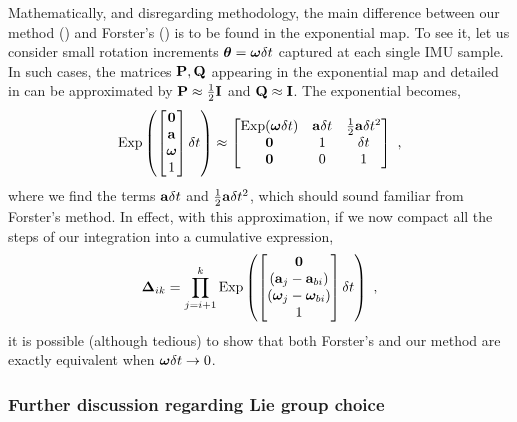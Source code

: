 Mathematically, and disregarding methodology, the main difference between our method () and Forster's \cite{forster2017-TRO} () is to be found in the exponential map. 
To see it, let us consider small rotation increments ${{\bm \theta}}={{\bm \omega}}\delta t$ captured at each single IMU sample. 
In such cases, the matrices ${\bf P},{\bf Q}$ appearing in the exponential map  and detailed in  can be approximated by ${\bf P}\approx\tfrac12{\bf I}$ and ${\bf Q}\approx{\bf I}$.
The exponential becomes,
%
\begin{align}
    \operatorname*{Exp}\left(\begin{bmatrix}
    \bf0 \\ {\bf a} \\ {{\bm \omega}} \\ 1
    \end{bmatrix}\delta t\right) \approx \begin{bmatrix}
    \operatorname*{Exp}({{\bm \omega}}\delta t) & {\bf a}\delta t & \tfrac12{\bf a}\delta t^2 \\
    \bf0 & 1 & \delta t \\
    \bf0 & 0 & 1
    \end{bmatrix}
~,
\end{align}
%
where we find the terms ${\bf a}\delta t$ and $\tfrac12{\bf a}\delta t^2$, which should sound familiar from Forster's method. 
In effect, with this approximation, if we now compact all the steps  of our integration into a cumulative expression,
%
\begin{align}
    {{\bm \Delta}}_{ik} = \prod_{j=i+1}^k \operatorname*{Exp}\left(\begin{bmatrix}
    \bf0 \\ ({\bf a}_j-{\bf a}_{bi}) \\ ({{\bm \omega}}_j-{{\bm \omega}}_{bi}) \\ 1
    \end{bmatrix}\delta t\right)
~,
\end{align}
%
it is possible (although tedious) to show that both Forster's and our method are exactly equivalent when ${{\bm \omega}}\delta t\to0$.

\subsubsection{Further discussion regarding Lie group choice}

